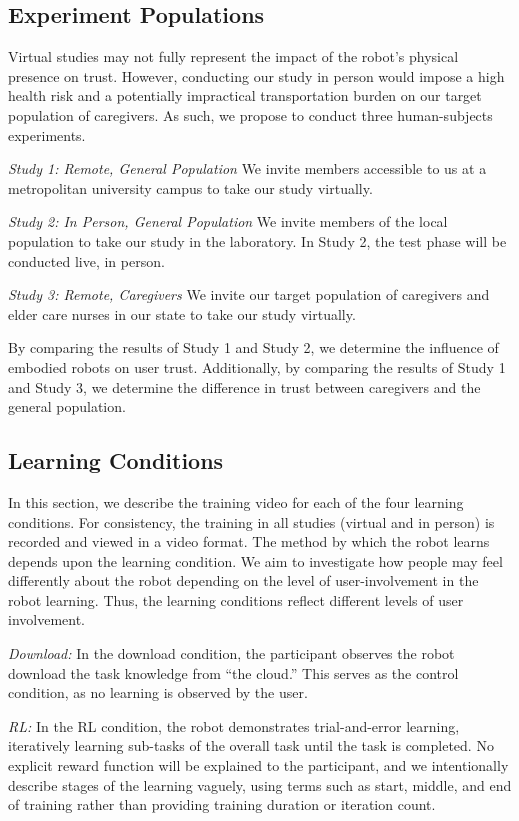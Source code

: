 \documentclass[letterpaper]{article} %
\begin{document}
\subsection{Experiment Populations} \label{sec:humanexperiment}
Virtual studies may not fully represent the impact of the robot's physical presence on trust. However, conducting our study in person would impose a high health risk and a potentially impractical transportation burden on our target population of caregivers. As such, we propose to conduct three human-subjects experiments.

\indent \textit{Study 1: Remote, General Population} We invite members accessible to us at a metropolitan university campus to take our study virtually.

\indent \textit{Study 2: In Person, General Population} We invite members of the local population to take our study in the laboratory. In Study 2, the test phase will be conducted live, in person.

\indent \textit{Study 3: Remote, Caregivers} We invite our target population of caregivers and elder care nurses in our state to take our study virtually.

By comparing the results of Study 1 and Study 2, we determine the influence of embodied robots on user trust. Additionally, by comparing the results of Study 1 and Study 3, we determine the difference in trust between caregivers and the general population.

\subsection{Learning Conditions}
\label{sec:conditions}
In this section, we describe the training video for each of the four learning conditions. For consistency, the training in all studies (virtual and in person) is recorded and viewed in a video format. The method by which the robot learns depends upon the learning condition. We aim to investigate how people may feel differently about the robot depending on the level of user-involvement in the robot learning. Thus, the learning conditions reflect different levels of user involvement.

\textit{Download: }In the download condition, the participant observes the robot download the task knowledge from ``the cloud.'' This serves as the control condition, as no learning is observed by the user.

\textit{RL: }In the RL condition, the robot demonstrates trial-and-error learning, iteratively learning sub-tasks of the overall task until the task is completed. No explicit reward function will be explained to the participant, and we intentionally describe stages of the learning vaguely, using terms such as start, middle, and end of training rather than providing training duration or iteration count.
\end{document}

